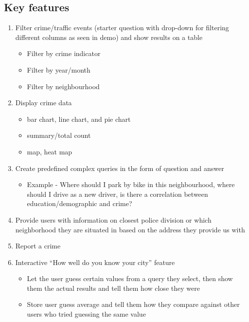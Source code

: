 \documentclass[12pt, a4paper]{article}
\begin{document}
\subsection*{Key features}
\begin{enumerate}
\item Filter crime/traffic events (starter question with drop-down for filtering different columns as seen in demo) and show results on a table
\begin{itemize}
    \item Filter by crime indicator
    \item Filter by year/month
    \item Filter by neighbourhood
\end{itemize}
\item Display crime data
\begin{itemize}
\item bar chart, line chart, and pie chart
\item summary/total count
\item map, heat map
\end{itemize}
\item Create predefined complex queries in the form of question and answer
\begin{itemize}
    \item Example - Where should I park by bike in this neighbourhood, where should I drive as a new driver, is there a correlation between education/demographic and crime?
\end{itemize}
\item Provide users with information on closest police division or which neighborhood they are situated in based on the address they provide us with
\item Report a crime
\item Interactive “How well do you know your city” feature
\begin{itemize}
    \item Let the user guess certain values from a query they select, then show them the actual results and tell them how close they were
    \item Store user guess average and tell them how they compare against other users who tried guessing the same value
\end{itemize}
\end{enumerate}
\end{document}
